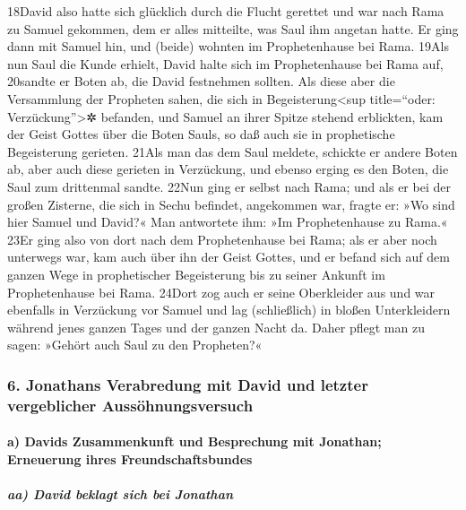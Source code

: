 18David also hatte sich glücklich durch die Flucht gerettet und war nach
Rama zu Samuel gekommen, dem er alles mitteilte, was Saul ihm angetan
hatte. Er ging dann mit Samuel hin, und (beide) wohnten im
Prophetenhause bei Rama. 19Als nun Saul die Kunde erhielt, David halte
sich im Prophetenhause bei Rama auf, 20sandte er Boten ab, die David
festnehmen sollten. Als diese aber die Versammlung der Propheten sahen,
die sich in Begeisterung\textless sup title=``oder:
Verzückung''\textgreater✲ befanden, und Samuel an ihrer Spitze stehend
erblickten, kam der Geist Gottes über die Boten Sauls, so daß auch sie
in prophetische Begeisterung gerieten. 21Als man das dem Saul meldete,
schickte er andere Boten ab, aber auch diese gerieten in Verzückung, und
ebenso erging es den Boten, die Saul zum drittenmal sandte. 22Nun ging
er selbst nach Rama; und als er bei der großen Zisterne, die sich in
Sechu befindet, angekommen war, fragte er: »Wo sind hier Samuel und
David?« Man antwortete ihm: »Im Prophetenhause zu Rama.« 23Er ging also
von dort nach dem Prophetenhause bei Rama; als er aber noch unterwegs
war, kam auch über ihn der Geist Gottes, und er befand sich auf dem
ganzen Wege in prophetischer Begeisterung bis zu seiner Ankunft im
Prophetenhause bei Rama. 24Dort zog auch er seine Oberkleider aus und
war ebenfalls in Verzückung vor Samuel und lag (schließlich) in bloßen
Unterkleidern während jenes ganzen Tages und der ganzen Nacht da. Daher
pflegt man zu sagen: »Gehört auch Saul zu den Propheten?«

\hypertarget{jonathans-verabredung-mit-david-und-letzter-vergeblicher-aussuxf6hnungsversuch}{%
\subsubsection{6. Jonathans Verabredung mit David und letzter
vergeblicher
Aussöhnungsversuch}\label{jonathans-verabredung-mit-david-und-letzter-vergeblicher-aussuxf6hnungsversuch}}

\hypertarget{a-davids-zusammenkunft-und-besprechung-mit-jonathan-erneuerung-ihres-freundschaftsbundes}{%
\paragraph{a) Davids Zusammenkunft und Besprechung mit Jonathan;
Erneuerung ihres
Freundschaftsbundes}\label{a-davids-zusammenkunft-und-besprechung-mit-jonathan-erneuerung-ihres-freundschaftsbundes}}

\hypertarget{aa-david-beklagt-sich-bei-jonathan}{%
\subparagraph{aa) David beklagt sich bei
Jonathan}\label{aa-david-beklagt-sich-bei-jonathan}}

